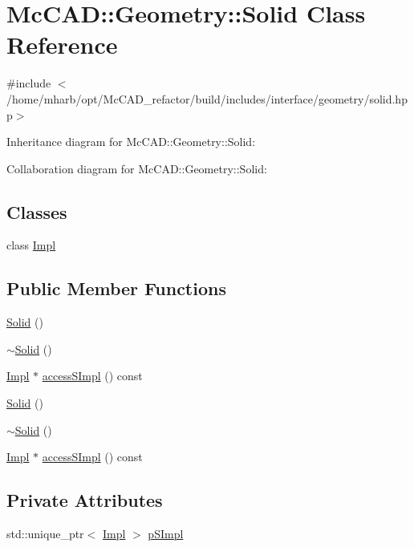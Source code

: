 \hypertarget{classMcCAD_1_1Geometry_1_1Solid}{}\section{Mc\+C\+AD\+:\+:Geometry\+:\+:Solid Class Reference}
\label{classMcCAD_1_1Geometry_1_1Solid}


{\ttfamily \#include $<$/home/mharb/opt/\+Mc\+C\+A\+D\+\_\+refactor/build/includes/interface/geometry/solid.\+hpp$>$}



Inheritance diagram for Mc\+C\+AD\+:\+:Geometry\+:\+:Solid\+:


Collaboration diagram for Mc\+C\+AD\+:\+:Geometry\+:\+:Solid\+:
\subsection*{Classes}
\begin{DoxyCompactItemize}
\item 
class \hyperlink{classMcCAD_1_1Geometry_1_1Solid_1_1Impl}{Impl}
\end{DoxyCompactItemize}
\subsection*{Public Member Functions}
\begin{DoxyCompactItemize}
\item 
\hyperlink{classMcCAD_1_1Geometry_1_1Solid_ab54263b54174e2742c60e9c94e151819}{Solid} ()
\item 
\hyperlink{classMcCAD_1_1Geometry_1_1Solid_a89070bfa348d36f00377c80d1059cbfd}{$\sim$\+Solid} ()
\item 
\hyperlink{classMcCAD_1_1Geometry_1_1Solid_1_1Impl}{Impl} $\ast$ \hyperlink{classMcCAD_1_1Geometry_1_1Solid_a41304db7cdf4762342ea833b15764180}{access\+S\+Impl} () const
\item 
\hyperlink{classMcCAD_1_1Geometry_1_1Solid_ab54263b54174e2742c60e9c94e151819}{Solid} ()
\item 
\hyperlink{classMcCAD_1_1Geometry_1_1Solid_a89070bfa348d36f00377c80d1059cbfd}{$\sim$\+Solid} ()
\item 
\hyperlink{classMcCAD_1_1Geometry_1_1Solid_1_1Impl}{Impl} $\ast$ \hyperlink{classMcCAD_1_1Geometry_1_1Solid_a1d058cac2d5619e21813a16706dc1826}{access\+S\+Impl} () const
\end{DoxyCompactItemize}
\subsection*{Private Attributes}
\begin{DoxyCompactItemize}
\item 
std\+::unique\+\_\+ptr$<$ \hyperlink{classMcCAD_1_1Geometry_1_1Solid_1_1Impl}{Impl} $>$ \hyperlink{classMcCAD_1_1Geometry_1_1Solid_a77640dab3831396c6527ead13c953614}{p\+S\+Impl}
\end{DoxyCompactItemize}


